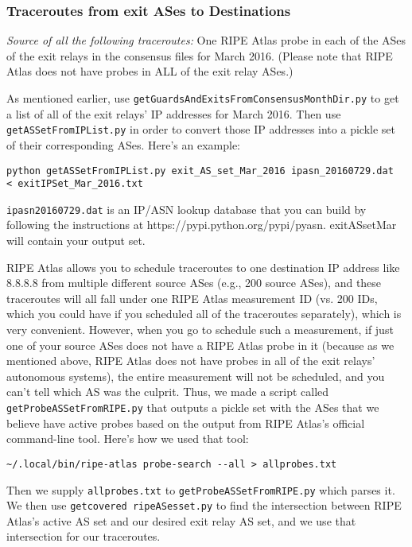 \documentclass{article}
\begin{document}
\subsubsection{Traceroutes from exit ASes to Destinations}
\emph{Source of all the following traceroutes:} One RIPE Atlas probe in each of the ASes of the 
exit relays in the consensus files for March 2016. (Please note that RIPE Atlas does not 
have probes in ALL of the exit relay ASes.)

As mentioned earlier, use {\tt getGuardsAndExitsFromConsensusMonthDir.py} to get a 
list of all of the exit relays' IP addresses for March 2016. 
Then use {\tt getASSetFromIPList.py} 
in order to convert those IP addresses into a pickle set 
of their corresponding ASes. Here's an example:
\begin{lstlisting}
python getASSetFromIPList.py exit_AS_set_Mar_2016 ipasn_20160729.dat 
< exitIPSet_Mar_2016.txt
\end{lstlisting}
{\tt ipasn\textunderscore 20160729.dat} is an IP/ASN lookup database that you can build 
by following the instructions at https://pypi.python.org/pypi/pyasn. 
exit\textunderscore AS\textunderscore set\textunderscore Mar 
will contain your output set.

RIPE Atlas allows you to schedule traceroutes to one destination IP address 
like 8.8.8.8 from multiple different source ASes (e.g., 200 source ASes), and these 
traceroutes will all fall under one RIPE Atlas measurement ID (vs. 200 IDs, which 
you could have if you scheduled all of the traceroutes separately), which is very 
convenient. However, when you go to schedule such a measurement, if just one of your 
source ASes does not have a RIPE Atlas probe in it (because as we mentioned above, 
RIPE Atlas does not have probes in all of the exit relays' autonomous systems),
the entire measurement will not be 
scheduled, and you can't tell which AS was the culprit. Thus, we made a script 
called {\tt getProbeASSetFromRIPE.py} that outputs a pickle set with the 
ASes that we believe have active probes based on the output from RIPE Atlas's 
official command-line tool. Here's how we used that tool:
\begin{lstlisting}
~/.local/bin/ripe-atlas probe-search --all > allprobes.txt
\end{lstlisting}
Then we supply {\tt allprobes.txt} to {\tt getProbeASSetFromRIPE.py} which 
parses it. We then use {\tt get\textunderscore covered\textunderscore 
ripe\textunderscore ASes\textunderscore set.py} to find the intersection 
between RIPE Atlas's active AS set and our desired exit relay AS set, and 
we use that intersection for our traceroutes.
\end{document}

